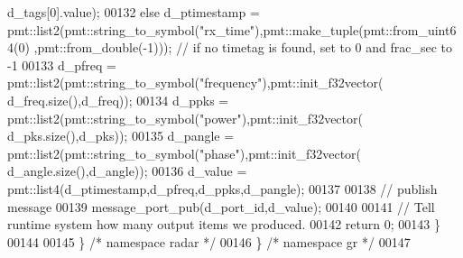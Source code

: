 \begin{DoxyCode}
      d_tags[0].value);
00132         \textcolor{keywordflow}{else} d_ptimestamp = pmt::list2(pmt::string\_to\_symbol(\textcolor{stringliteral}{"rx\_time"}),pmt::make\_tuple(pmt::from\_uint64(0)
      ,pmt::from\_double(-1))); \textcolor{comment}{// if no timetag is found, set to 0 and frac\_sec to -1}
00133         d_pfreq = pmt::list2(pmt::string\_to\_symbol(\textcolor{stringliteral}{"frequency"}),pmt::init\_f32vector(
      d_freq.size(),d_freq));
00134         d_ppks = pmt::list2(pmt::string\_to\_symbol(\textcolor{stringliteral}{"power"}),pmt::init\_f32vector(
      d_pks.size(),d_pks));
00135         d_pangle = pmt::list2(pmt::string\_to\_symbol(\textcolor{stringliteral}{"phase"}),pmt::init\_f32vector(
      d_angle.size(),d_angle));
00136         d_value = pmt::list4(d_ptimestamp,d_pfreq,d_ppks,d_pangle);
00137         
00138         \textcolor{comment}{// publish message}
00139         message\_port\_pub(d_port_id,d_value);
00140 
00141         \textcolor{comment}{// Tell runtime system how many output items we produced.}
00142         \textcolor{keywordflow}{return} 0;
00143     \}
00144 
00145   \} \textcolor{comment}{/* namespace radar */}
00146 \} \textcolor{comment}{/* namespace gr */}
00147 
\end{DoxyCode}
